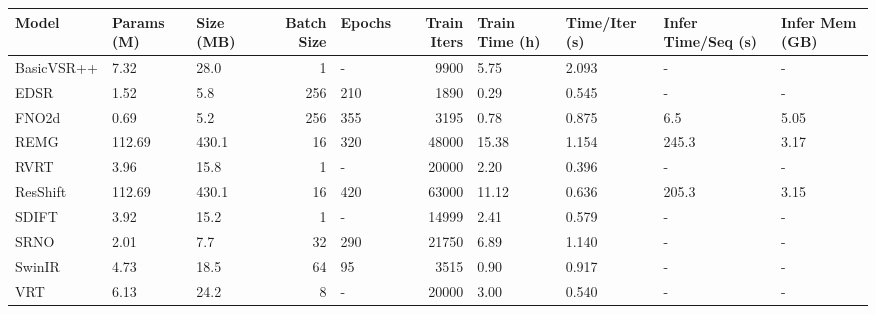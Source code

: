 \begin{tabular}{lllrlrllll}
\toprule
Model & Params (M) & Size (MB) & Batch Size & Epochs & Train Iters & Train Time (h) & Time/Iter (s) & Infer Time/Seq (s) & Infer Mem (GB) \\
\midrule
BasicVSR++ & 7.32 & 28.0 & 1 & - & 9900 & 5.75 & 2.093 & - & - \\
EDSR & 1.52 & 5.8 & 256 & 210 & 1890 & 0.29 & 0.545 & - & - \\
FNO2d & 0.69 & 5.2 & 256 & 355 & 3195 & 0.78 & 0.875 & 6.5 & 5.05 \\
REMG & 112.69 & 430.1 & 16 & 320 & 48000 & 15.38 & 1.154 & 245.3 & 3.17 \\
RVRT & 3.96 & 15.8 & 1 & - & 20000 & 2.20 & 0.396 & - & - \\
ResShift & 112.69 & 430.1 & 16 & 420 & 63000 & 11.12 & 0.636 & 205.3 & 3.15 \\
SDIFT & 3.92 & 15.2 & 1 & - & 14999 & 2.41 & 0.579 & - & - \\
SRNO & 2.01 & 7.7 & 32 & 290 & 21750 & 6.89 & 1.140 & - & - \\
SwinIR & 4.73 & 18.5 & 64 & 95 & 3515 & 0.90 & 0.917 & - & - \\
VRT & 6.13 & 24.2 & 8 & - & 20000 & 3.00 & 0.540 & - & - \\
\bottomrule
\end{tabular}
